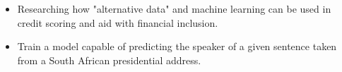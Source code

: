 \documentclass[10pt,a4paper]{altacv}
\begin{document}

\begin{itemize}
\item Researching how "alternative data" and machine learning can be used in credit scoring and aid with financial inclusion. 
\end{itemize}

\divider

\begin{itemize}
\item Train a model capable of predicting the speaker of a given sentence taken from a South African presidential address.
\end{itemize}
\end{document}
